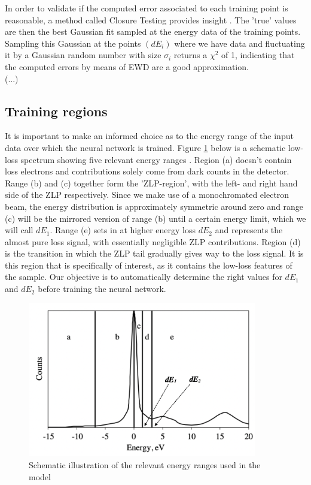 \documentclass[11pt,a4paper]{article}
\numberwithin{equation}{section}
\numberwithin{figure}{section}
\numberwithin{table}{section}
\begin{document}
In order to validate if the computed error associated to each training point is reasonable, a method called Closure Testing provides insight \cite{closure}.  The 'true' values are then the best Gaussian fit sampled at the energy data of the training points. Sampling this Gaussian at the points $(dE_i)$ where we have data and fluctuating it by a Gaussian random number with size $\sigma_i$ returns a $\chi^2$ of 1, indicating that the computed errors by means of EWD are a good approximation.\\ (...)

\subsection{Training regions}
It is important to make an informed choice as to the energy range of the input data over which the neural network is trained. Figure \ref{ranges} below is a schematic low-loss spectrum showing five relevant energy ranges \cite{reed}. Region (a) doesn't contain loss electrons and contributions solely come from dark counts in the detector. Range (b) and (c) together form the 'ZLP-region', with the left- and right hand side of the ZLP respectively. Since we make use of a monochromated electron beam, the energy distribution is approximately symmetric around zero and range (c) will be the mirrored version of range (b) until a certain energy limit, which we will call $dE_1$. Range (e) sets in at higher energy loss $dE_2$ and represents the almost pure loss signal, with essentially negligible ZLP contributions. Region (d) is the transition in which the ZLP tail gradually gives way to the loss signal. It is this region that is specifically of interest, as it contains the low-loss features of the sample.  Our objective is to automatically determine the right values for $dE_1$ and $dE_2$ before training the neural network.

\begin{figure}[H]
    \centering
    \includegraphics[width=100mm]{plots/ranges.png}
    \caption{Schematic illustration of the relevant energy ranges used in the model}
    \label{ranges}
\end{figure}
\end{document}
